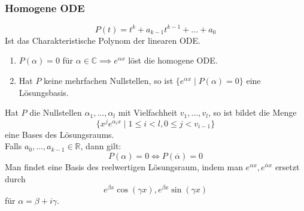   \subsubsection{Homogene ODE}
      $$P(t)=t^k+a_{k-1}t^{k-1}+...+a_0$$
      Ist das Charakteristische Polynom der linearen ODE.
      \begin{enumerate}
        \item $P(\alpha)=0$ für $\alpha\in\mathbb C\implies e^{\alpha x}$ löst die
          homogene ODE.
        \item Hat $P$ keine mehrfachen Nullstellen, so ist $\{e^{\alpha x}\mid
          P(\alpha)=0\}$ eine Lösungsbasis.
      \end{enumerate}
      Hat $P$ die Nullstellen $\alpha_1,...,\alpha_l$ mit Vielfachheit
      $v_1,...,v_l$, so ist bildet die Menge $$\{x^je^{\alpha_i x}\mid 1\leq i<l,
      0\leq j<v_{i-1}\}$$ eine Bases des Lösungsraums.\\
      Falls $a_0,...,a_{k-1}\in\mathbb R$, dann gilt: $$P(\alpha)=0\iff
      P(\overline\alpha)=0$$ Man findet eine Basis des reelwertigen Lösungsraum,
      indem man $e^{\alpha x}, e^{\overline\alpha x}$ ersetzt durch $$e^{\beta
      x}\cos(\gamma x),e^{\beta x}\sin(\gamma x)$$ für $\alpha=\beta + i\gamma$.
